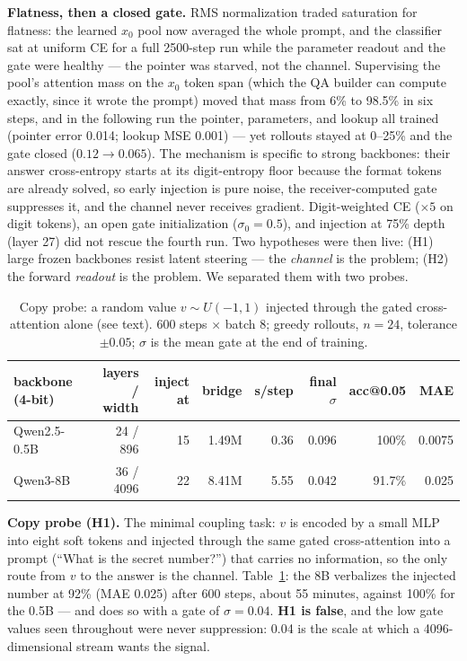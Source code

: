 \documentclass[11pt]{article}
\begin{document}
\textbf{Flatness, then a closed gate.} RMS normalization traded saturation for flatness: the learned $x_0$ pool now averaged the whole prompt, and the classifier sat at uniform CE for a full 2500-step run while the parameter readout and the gate were healthy --- the pointer was starved, not the channel. Supervising the pool's attention mass on the $x_0$ token span (which the QA builder can compute exactly, since it wrote the prompt) moved that mass from 6\% to 98.5\% in six steps, and in the following run the pointer, parameters, and lookup all trained (pointer error 0.014; lookup MSE 0.001) --- yet rollouts stayed at 0--25\% and the gate closed ($0.12\to0.065$). The mechanism is specific to strong backbones: their answer cross-entropy starts at its digit-entropy floor because the format tokens are already solved, so early injection is pure noise, the receiver-computed gate suppresses it, and the channel never receives gradient. Digit-weighted CE ($\times5$ on digit tokens), an open gate initialization ($\sigma_0=0.5$), and injection at 75\% depth (layer 27) did not rescue the fourth run. Two hypotheses were then live: (H1) large frozen backbones resist latent steering --- the \emph{channel} is the problem; (H2) the forward \emph{readout} is the problem. We separated them with two probes.

\begin{table}[t]
\centering
\caption{Copy probe: a random value $v\sim U(-1,1)$ injected through the gated cross-attention alone (see text). 600 steps $\times$ batch 8; greedy rollouts, $n{=}24$, tolerance $\pm0.05$; $\sigma$ is the mean gate at the end of training.}
\label{tab:copy}
\small
\begin{tabular}{lrrrrrrr}
\toprule
backbone (4-bit) & layers / width & inject at & bridge & s/step & final $\sigma$ & acc@0.05 & MAE \\
\midrule
Qwen2.5-0.5B & 24 / 896 & 15 & 1.49M & 0.36 & 0.096 & 100\% & 0.0075 \\
Qwen3-8B & 36 / 4096 & 22 & 8.41M & 5.55 & 0.042 & 91.7\% & 0.025 \\
\bottomrule
\end{tabular}
\end{table}

\textbf{Copy probe (H1).} The minimal coupling task: $v$ is encoded by a small MLP into eight soft tokens and injected through the same gated cross-attention into a prompt (``What is the secret number?'') that carries no information, so the only route from $v$ to the answer is the channel. Table~\ref{tab:copy}: the 8B verbalizes the injected number at 92\% (MAE 0.025) after 600 steps, about 55 minutes, against 100\% for the 0.5B --- and does so with a gate of $\sigma=0.04$. \textbf{H1 is false}, and the low gate values seen throughout were never suppression: 0.04 is the scale at which a 4096-dimensional stream wants the signal.
\end{document}

